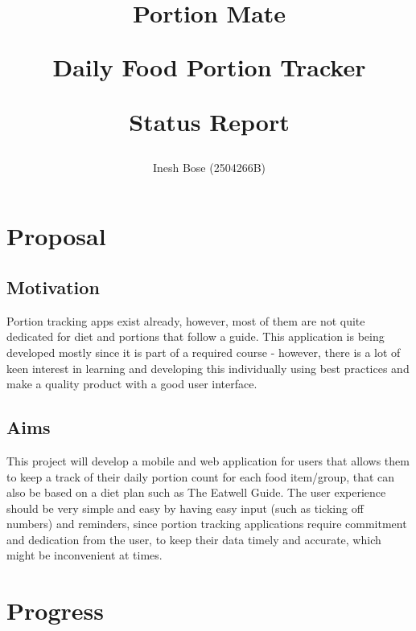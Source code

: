 \documentclass[11pt]{article}
\title{%
    {\Large Portion Mate \par}
    {\small Daily Food Portion Tracker \par}
    \vspace{0.5em}
    {\LARGE Status Report}
}
\author{Inesh Bose (2504266B)}
\date{}
\begin{document}
\maketitle

\newcommand{\tightlist}[0]{\setlength\itemsep{0.2em}}


\section{Proposal}\label{proposal}

\subsection{Motivation}\label{motivation}

Portion tracking apps exist already, however, most of them are not quite dedicated for diet and portions that follow a guide. This application is being developed mostly since it is part of a required course - however, there is a lot of keen interest in learning and developing this individually using best practices and make a quality product with a good user interface.

\subsection{Aims}\label{aims}

This project will develop a mobile and web application for users that allows them to keep a track of their daily portion count for each food item/group, that can also be based on a diet plan such as The Eatwell Guide. The user experience should be very simple and easy by having easy input (such as ticking off numbers) and reminders, since portion tracking applications require commitment and dedication from the user, to keep their data timely and accurate, which might be inconvenient at times.

\section{Progress}\label{progress}
\end{document}

